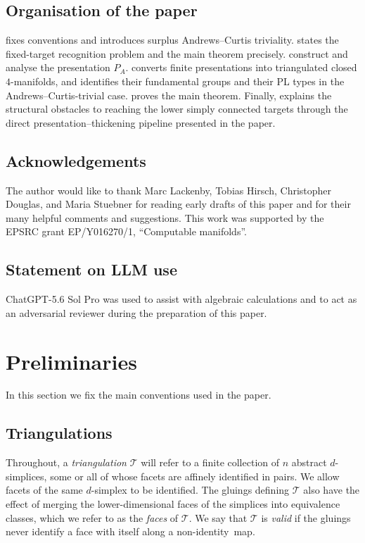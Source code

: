 \documentclass[a4paper,11pt,reqno]{amsart}
\theoremstyle{definition}
\theoremstyle{remark}
\newcommand{\tri}{\mathcal{T}}
\begin{document}
	\subsection*{Organisation of the paper}
	 fixes conventions and introduces surplus Andrews–Curtis triviality.
	 states the fixed-target recognition problem and the main theorem precisely.
	 construct and analyse the presentation $P_A$.  converts finite presentations into triangulated closed $4$-manifolds, and  identifies their fundamental groups and their PL types in the Andrews--Curtis-trivial case. 
	 proves the main theorem. 
	Finally,  explains the structural obstacles to
	reaching the lower simply connected targets through the direct
	presentation--thickening pipeline presented in the paper.
		
	\subsection*{Acknowledgements}
	The author would like to thank Marc Lackenby, Tobias Hirsch, Christopher Douglas, and Maria Stuebner for reading early drafts of this paper and for their many helpful comments and suggestions.
	This work was supported by the EPSRC grant EP/Y016270/1, ``Computable manifolds''.
	
	\subsection*{Statement on LLM use}
	ChatGPT-5.6 Sol Pro was used to assist with algebraic calculations and to act as an adversarial reviewer during the preparation of this paper.
	
	
	\section{Preliminaries}
	\label{sec:background}
	In this section we fix the main conventions used in the paper. 
	
	\subsection*{Triangulations}
	Throughout, a \emph{triangulation} $\tri$ will refer to a finite collection of $n$ abstract $d$-simplices, some or all of whose facets are affinely identified in pairs. 
	We allow facets of the same $d$-simplex to be identified. The gluings defining $\tri$ also have the effect of merging the lower-dimensional faces of the simplices into equivalence classes, which we refer to as the \emph{faces} of $\tri$. We say that $\tri$ is \emph{valid} if the gluings never identify a face with itself along a non-identity~map.
	
\end{document}
